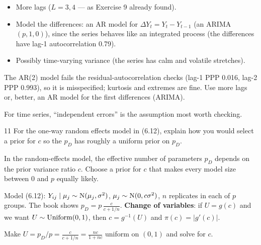 \documentclass[11pt]{article}
\begin{document}
\begin{itemize}
\item More lags ($L=3,4$ --- as Exercise 9 already found).
\item Model the differences: an AR model for $\Delta Y_t=Y_t-Y_{t-1}$ (an ARIMA$(p,1,0)$), since the series behaves like an integrated process (the differences have lag-1 autocorrelation 0.79).
\item Possibly time-varying variance (the series has calm and volatile stretches).
\end{itemize}

\begin{answer}
The AR(2) model fails the residual-autocorrelation checks (lag-1 PPP 0.016, lag-2 PPP 0.993), so it is misspecified; kurtosis and extremes are fine. Use more lags or, better, an AR model for the first differences (ARIMA).
\end{answer}

\begin{takeaway}
For time series, ``independent errors'' is the assumption most worth checking.
\end{takeaway}


\begin{problem}{11}
For the one-way random effects model in (6.12), explain how you would select a prior for $c$ so the $p_D$ has roughly a uniform prior on $p_D$.
\end{problem}

\begin{restate}
In the random-effects model, the effective number of parameters $p_D$ depends on the prior variance ratio $c$. Choose a prior for $c$ that makes every model size between 0 and $p$ equally likely.
\end{restate}

\begin{recall}
Model (6.12): $Y_{ij}\mid\mu_j\sim\mathrm{N}(\mu_j,\sigma^2)$, $\mu_j\sim\mathrm{N}(0,c\sigma^2)$, $n$ replicates in each of $p$ groups. The book shows $p_D=p\,\frac{c}{c+1/n}$.
\textbf{Change of variables}: if $U=g(c)$ and we want $U\sim\mathrm{Uniform}(0,1)$, then $c=g^{-1}(U)$ and $\pi(c)=|g'(c)|$.
\end{recall}

\begin{keyidea}
Make $U=p_D/p=\frac{c}{c+1/n}=\frac{nc}{1+nc}$ uniform on $(0,1)$ and solve for $c$.
\end{keyidea}
\end{document}
